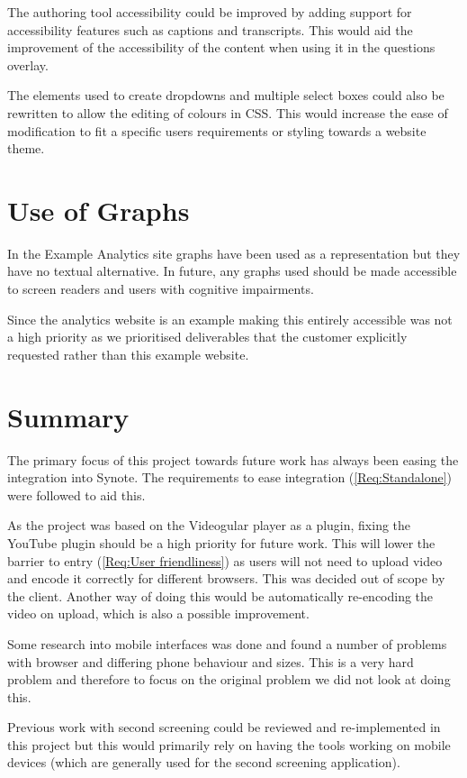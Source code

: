 The authoring tool accessibility could be improved by adding support for accessibility features such as captions and transcripts. This would aid the improvement of the accessibility of the content when using it in the questions overlay.

The elements used to create dropdowns and multiple select boxes could also be rewritten to allow the editing of colours in \gls{CSS}. This would increase the ease of modification to fit a specific users requirements or styling towards a website theme.

\section{Use of Graphs}

In the Example Analytics site graphs have been used as a representation but they have no textual alternative. In future, any graphs used should be made accessible to screen readers and users with cognitive impairments.

Since the analytics website is an example making this entirely accessible was not a high priority as we prioritised deliverables that the customer explicitly requested rather than this example website.

\section{Summary}

The primary focus of this project towards future work has always been easing the integration into Synote. The requirements to ease integration (\cref{Req:Standalone}) were followed to aid this.

As the project was based on the Videogular player as a plugin, fixing the YouTube plugin should be a high priority for future work. This will lower the barrier to entry (\cref{Req:User friendliness}) as users will not need to upload video and encode it correctly for different browsers. This was decided out of scope by the client. Another way of doing this would be automatically re-encoding the video on upload, which is also a possible improvement.

Some research into mobile interfaces was done and found a number of problems with browser and differing phone behaviour and sizes. This is a very hard problem and therefore to focus on the original problem we did not look at doing this.

Previous work with second screening could be reviewed and re-implemented in this project but this would primarily rely on having the tools working on mobile devices (which are generally used for the second screening application).

